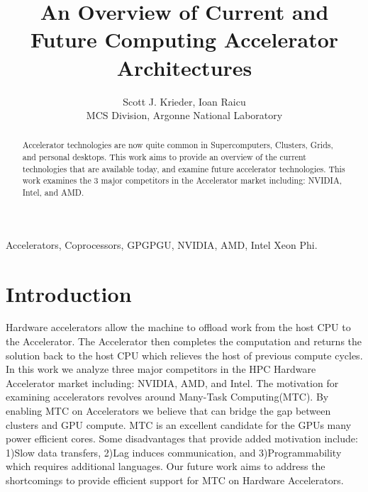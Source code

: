 \documentclass[conference]{IEEEtran}
\begin{document}
%
\title{An Overview of Current and Future Computing Accelerator Architectures}


\author{Scott J. Krieder,
Ioan Raicu\\
MCS Division, Argonne National Laboratory
}


\maketitle

\begin{abstract}
Accelerator technologies are now quite common in Supercomputers, Clusters, Grids, and personal desktops. This work aims to provide an overview of the current technologies that are available today, and examine future accelerator technologies. This work examines the 3 major competitors in the Accelerator market including: NVIDIA, Intel, and AMD.
\end{abstract}

\begin{IEEEkeywords}
Accelerators, Coprocessors, GPGPGU, NVIDIA, AMD, Intel Xeon Phi.
\end{IEEEkeywords}

\IEEEpeerreviewmaketitle

\section{Introduction}
Hardware accelerators allow the machine to offload work from the host CPU to the Accelerator. The Accelerator then completes the computation and returns the solution back to the host CPU which relieves the host of previous compute cycles. In this work we analyze three major competitors in the HPC Hardware Accelerator market including: NVIDIA, AMD, and Intel. The motivation for examining accelerators revolves around Many-Task Computing(MTC).\cite{raicu2008toward} By enabling MTC on Accelerators we believe that can bridge the gap between clusters and GPU compute. MTC is an excellent candidate for the GPUs many power efficient cores. Some disadvantages that provide added motivation include: 1)Slow data transfers, 2)Lag induces communication, and 3)Programmability which requires additional languages. Our future work aims to address the shortcomings to provide efficient support for MTC on Hardware Accelerators.
\end{document}
